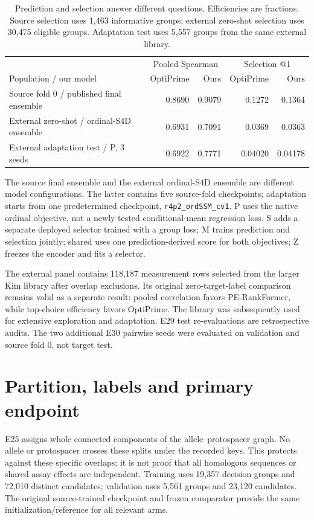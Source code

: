 \documentclass[11pt]{article}
\newcommand{\code}[1]{\texttt{\small #1}}
\begin{document}
\begin{table}[htbp]\centering\small
\caption{Prediction and selection answer different questions. Efficiencies are fractions.
Source selection uses 1,463 informative groups; external zero-shot selection uses 30,475
eligible groups. Adaptation test uses 5,557 groups from the same external library.}
\begin{tabular}{lrrrr}\toprule
& \multicolumn{2}{c}{Pooled Spearman} & \multicolumn{2}{c}{Selection @1}\\
Population / our model & OptiPrime & Ours & OptiPrime & Ours\\\midrule
Source fold 0 / published final ensemble & 0.8690 & 0.9079 & 0.1272 & 0.1364\\
External zero-shot / ordinal-S4D ensemble & 0.6931 & 0.7091 & 0.0369 & 0.0363\\
External adaptation test / P, 3 seeds & 0.6922 & 0.7771 & 0.04020 & 0.04178\\
\bottomrule\end{tabular}
\end{table}

The source final ensemble and the external ordinal-S4D ensemble are different model
configurations. The latter contains five source-fold checkpoints; adaptation starts from
one predetermined checkpoint, \code{r4p2\_ordSSM\_cv1}. P uses the native ordinal objective,
not a newly tested conditional-mean regression loss. S adds a separate deployed selector
trained with a group loss; M trains prediction and selection jointly; shared uses one
prediction-derived score for both objectives; Z freezes the encoder and fits a selector.

The external panel contains 118,187 measurement rows selected from the larger Kim library
after overlap exclusions. Its original zero-target-label comparison remains valid as a
separate result: pooled correlation favors PE-RankFormer, while top-choice efficiency
favors OptiPrime. The library was subsequently used for extensive exploration and
adaptation. E29 test re-evaluations are retrospective audits. The two additional E30
pairwise seeds were evaluated on validation and source fold 0, not target test.

\section{Partition, labels and primary endpoint}

E25 assigns whole connected components of the allele--protospacer graph. No allele or
protospacer crosses these splits under the recorded keys. This protects against these
specific overlaps; it is not proof that all homologous sequences or shared assay effects
are independent. Training uses 19,357 decision groups and 72,010 distinct candidates;
validation uses 5,561 groups and 23,120 candidates. The original source-trained checkpoint
and frozen comparator provide the same initialization/reference for all relevant arms.
\end{document}
